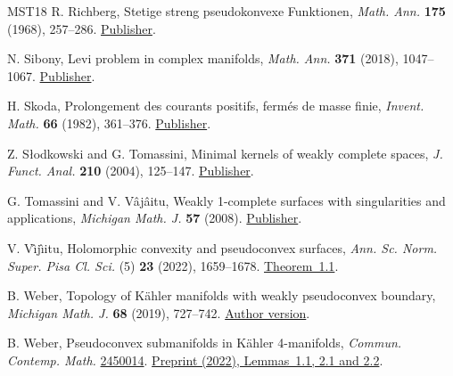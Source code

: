 \documentclass[11pt]{amsart}
\theoremstyle{remark}
\numberwithin{equation}{section}
\begin{document}
\begin{thebibliography}{MST18}
 R. Richberg, Stetige streng pseudokonvexe Funktionen,
\emph{Math. Ann.} \textbf{175} (1968), 257--286.
\href{https://doi.org/10.1007/BF02063212}{Publisher}.

 N. Sibony, Levi problem in complex manifolds,
\emph{Math. Ann.} \textbf{371} (2018), 1047--1067.
\href{https://doi.org/10.1007/s00208-017-1539-x}{Publisher}.

 H. Skoda, Prolongement des courants positifs, ferm\'es
de masse finie, \emph{Invent. Math.} \textbf{66} (1982), 361--376.
\href{https://doi.org/10.1007/BF01389217}{Publisher}.

 Z. S{\l}odkowski and G. Tomassini, Minimal kernels of
weakly complete spaces, \emph{J. Funct. Anal.} \textbf{210} (2004),
125--147. \href{https://doi.org/10.1016/S0022-1236(03)00182-4}{Publisher}.

 G. Tomassini and V. V\^aj\^aitu, Weakly 1-complete
surfaces with singularities and applications, \emph{Michigan Math. J.}
\textbf{57} (2008).
\href{https://doi.org/10.1307/mmj/1231770355}{Publisher}.

 V. V\^{\i}j\^{\i}itu, Holomorphic convexity and
pseudoconvex surfaces, \emph{Ann. Sc. Norm. Super. Pisa Cl. Sci.} (5)
\textbf{23} (2022), 1659--1678.
\href{https://doi.org/10.2422/2036-2145.202011_018}{Theorem~1.1}.

 B. Weber, Topology of K\"ahler manifolds with
weakly pseudoconvex boundary, \emph{Michigan Math. J.} \textbf{68}
(2019), 727--742. \href{https://arxiv.org/abs/1110.4571}{Author version}.

 B. Weber, Pseudoconvex submanifolds in K\"ahler
4-manifolds, \emph{Commun. Contemp. Math.}
\href{https://doi.org/10.1142/S0219199724500147}{2450014}.
\href{https://arxiv.org/abs/2208.00975}{Preprint (2022), Lemmas~1.1, 2.1 and 2.2}.

\end{thebibliography}
\end{document}
